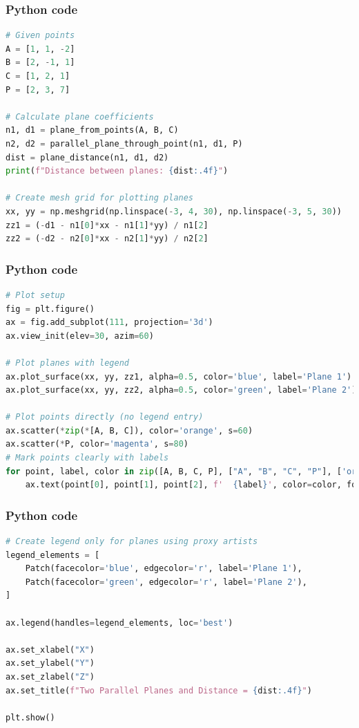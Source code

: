 \documentclass{beamer}
\begin{document}
\begin{frame}[fragile]
    \frametitle{Python code}

    \begin{lstlisting}[language=Python]
# Given points
A = [1, 1, -2]
B = [2, -1, 1]
C = [1, 2, 1]
P = [2, 3, 7]

# Calculate plane coefficients
n1, d1 = plane_from_points(A, B, C)
n2, d2 = parallel_plane_through_point(n1, d1, P)
dist = plane_distance(n1, d1, d2)
print(f"Distance between planes: {dist:.4f}")

# Create mesh grid for plotting planes
xx, yy = np.meshgrid(np.linspace(-3, 4, 30), np.linspace(-3, 5, 30))
zz1 = (-d1 - n1[0]*xx - n1[1]*yy) / n1[2]
zz2 = (-d2 - n2[0]*xx - n2[1]*yy) / n2[2]

           \end{lstlisting}
\end{frame}
\begin{frame}[fragile]
    \frametitle{Python code}

    \begin{lstlisting}[language=Python]
# Plot setup
fig = plt.figure()
ax = fig.add_subplot(111, projection='3d')
ax.view_init(elev=30, azim=60)

# Plot planes with legend
ax.plot_surface(xx, yy, zz1, alpha=0.5, color='blue', label='Plane 1')
ax.plot_surface(xx, yy, zz2, alpha=0.5, color='green', label='Plane 2')

# Plot points directly (no legend entry)
ax.scatter(*zip(*[A, B, C]), color='orange', s=60)
ax.scatter(*P, color='magenta', s=80)
# Mark points clearly with labels
for point, label, color in zip([A, B, C, P], ["A", "B", "C", "P"], ['orange', 'orange', 'orange', 'magenta']):
    ax.text(point[0], point[1], point[2], f'  {label}', color=color, fontsize=12, fontweight='bold')
    \end{lstlisting}
\end{frame}
\begin{frame}[fragile]
    \frametitle{Python code}

    \begin{lstlisting}[language=Python]
# Create legend only for planes using proxy artists
legend_elements = [
    Patch(facecolor='blue', edgecolor='r', label='Plane 1'),
    Patch(facecolor='green', edgecolor='r', label='Plane 2'),
]

ax.legend(handles=legend_elements, loc='best')

ax.set_xlabel("X")
ax.set_ylabel("Y")
ax.set_zlabel("Z")
ax.set_title(f"Two Parallel Planes and Distance = {dist:.4f}")

plt.show()
\end{lstlisting}
\end{frame}
\end{document}
